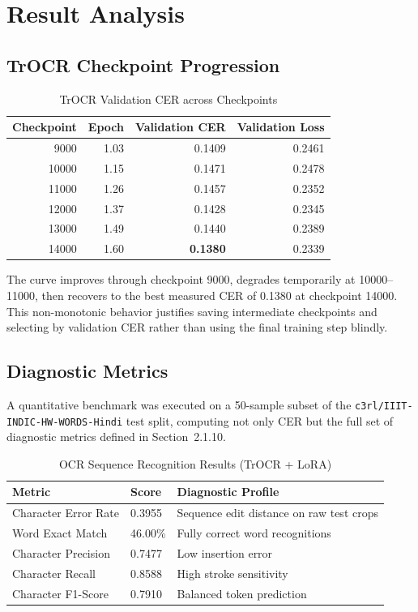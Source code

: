 \documentclass[12pt,a4paper]{report}
\begin{document}
\section{Result Analysis}

\subsection{TrOCR Checkpoint Progression}

\begin{table}[htbp]
\centering
\caption{TrOCR Validation CER across Checkpoints}
\small
\begin{tabular}{rrrr}
\toprule
\textbf{Checkpoint} & \textbf{Epoch} & \textbf{Validation CER} & \textbf{Validation Loss} \\
\midrule
9000 & 1.03 & 0.1409 & 0.2461 \\
10000 & 1.15 & 0.1471 & 0.2478 \\
11000 & 1.26 & 0.1457 & 0.2352 \\
12000 & 1.37 & 0.1428 & 0.2345 \\
13000 & 1.49 & 0.1440 & 0.2389 \\
14000 & 1.60 & \textbf{0.1380} & 0.2339 \\
\bottomrule
\end{tabular}
\end{table}

The curve improves through checkpoint 9000, degrades temporarily at 10000--11000, then recovers to the best measured CER of 0.1380 at checkpoint 14000. This non-monotonic behavior justifies saving intermediate checkpoints and selecting by validation CER rather than using the final training step blindly.

\subsection{Diagnostic Metrics}
A quantitative benchmark was executed on a 50-sample subset of the \texttt{c3rl/IIIT-INDIC-HW-WORDS-Hindi} test split, computing not only CER but the full set of diagnostic metrics defined in Section~2.1.10.

\begin{table}[htbp]
\centering
\caption{OCR Sequence Recognition Results (TrOCR + LoRA)}
\small
\begin{tabular}{p{4.4cm}p{2.2cm}p{6.4cm}}
\toprule
\textbf{Metric} & \textbf{Score} & \textbf{Diagnostic Profile} \\
\midrule
Character Error Rate & 0.3955 & Sequence edit distance on raw test crops \\
Word Exact Match & 46.00\% & Fully correct word recognitions \\
Character Precision & 0.7477 & Low insertion error \\
Character Recall & 0.8588 & High stroke sensitivity \\
Character F1-Score & 0.7910 & Balanced token prediction \\
\bottomrule
\end{tabular}
\end{table}
\end{document}
